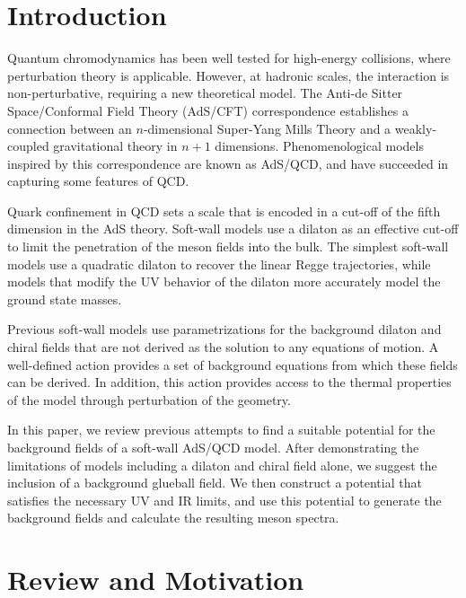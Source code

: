 \section{Introduction}

Quantum chromodynamics has been well tested for high-energy collisions, where perturbation theory is applicable. However, at hadronic scales, the interaction is non-perturbative, requiring a new theoretical model. The Anti-de Sitter Space/Conformal Field Theory (AdS/CFT) correspondence establishes a connection between an $n$-dimensional Super-Yang Mills Theory and a weakly-coupled gravitational theory in $n+1$ dimensions. Phenomenological models inspired by this correspondence are known as AdS/QCD, and have succeeded in capturing some features of QCD. 

Quark confinement in QCD sets a scale that is encoded in a cut-off of the fifth dimension in the AdS theory. Soft-wall models use a dilaton as an effective cut-off to limit the penetration of the meson fields into the bulk. The simplest soft-wall models use a quadratic dilaton to recover the linear Regge trajectories, while models that modify the UV behavior of the dilaton more accurately model the ground state masses.

Previous soft-wall models use parametrizations for the background dilaton and chiral fields that are not derived as the solution to any equations of motion. A well-defined action provides a set of background equations from which these fields can be derived. In addition, this action provides access to the thermal properties of the model through perturbation of the geometry.

In this paper, we review previous attempts to find a suitable potential for the background fields of a soft-wall AdS/QCD model. After demonstrating the limitations of models including a dilaton and chiral field alone, we suggest the inclusion of a background glueball field. We then construct a potential that satisfies the necessary UV and IR limits, and use this potential to generate the background fields and calculate the resulting meson spectra.

\section{Review and Motivation}

